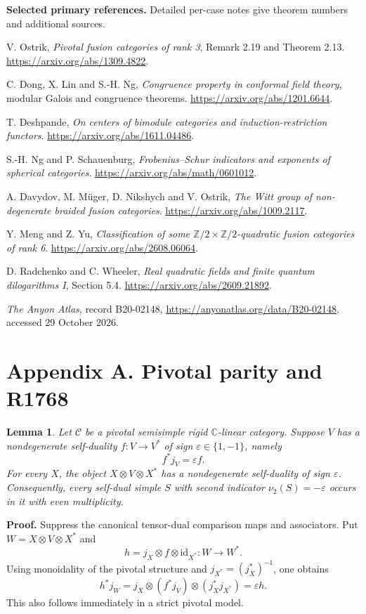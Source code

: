 \documentclass[11pt,a4paper]{article}
\newtheorem*{lemma}{Lemma}
\begin{document}
\textbf{Selected primary references.} Detailed per-case notes give theorem numbers and additional sources.
\begin{enumerate}[label={[\arabic*]}]
\item V. Ostrik, \emph{Pivotal fusion categories of rank 3}, Remark 2.19 and Theorem 2.13. \url{https://arxiv.org/abs/1309.4822}.
\item C. Dong, X. Lin and S.-H. Ng, \emph{Congruence property in conformal field theory}, modular Galois and congruence theorems. \url{https://arxiv.org/abs/1201.6644}.
\item T. Deshpande, \emph{On centers of bimodule categories and induction-restriction functors}. \url{https://arxiv.org/abs/1611.04486}.
\item S.-H. Ng and P. Schauenburg, \emph{Frobenius--Schur indicators and exponents of spherical categories}. \url{https://arxiv.org/abs/math/0601012}.
\item A. Davydov, M. M\"uger, D. Nikshych and V. Ostrik, \emph{The Witt group of non-degenerate braided fusion categories}. \url{https://arxiv.org/abs/1009.2117}.
\item Y. Meng and Z. Yu, \emph{Classification of some $\mathbb Z/2\times\mathbb Z/2$-quadratic fusion categories of rank 6}. \url{https://arxiv.org/abs/2608.06064}.
\item D. Radchenko and C. Wheeler, \emph{Real quadratic fields and finite quantum dilogarithms I}, Section 5.4. \url{https://arxiv.org/abs/2609.21892}.
\item \emph{The Anyon Atlas}, record B20-02148,
\url{https://anyonatlas.org/data/B20-02148}, accessed 29 October 2026.
\end{enumerate}
\newpage
\section*{Appendix A. Pivotal parity and R1768}
\begin{lemma}
Let \(\mathcal C\) be a pivotal semisimple rigid \(\mathbb C\)-linear category. Suppose \(V\) has a nondegenerate self-duality \(f:V\to V^*\) of sign \(\varepsilon\in\{1,-1\}\), namely
\[
f^*j_V=\varepsilon f.
\]
For every \(X\), the object \(X\otimes V\otimes X^*\) has a nondegenerate self-duality of sign \(\varepsilon\). Consequently, every self-dual simple \(S\) with second indicator \(\nu_2(S)=-\varepsilon\) occurs in it with even multiplicity.
\end{lemma}

\textbf{Proof.} Suppress the canonical tensor-dual comparison maps and associators. Put \(W=X\otimes V\otimes X^*\) and
\[
h=j_X\otimes f\otimes \mathrm{id}_{X^*}:W\longrightarrow W^*.
\]
Using monoidality of the pivotal structure and
\(j_{X^*}=(j_X^*)^{-1}\), one obtains
\[
h^*j_W
 =j_X\otimes(f^*j_V)\otimes(j_X^*j_{X^*})
 =\varepsilon h.
\]
This also follows immediately in a strict pivotal model.
\end{document}
